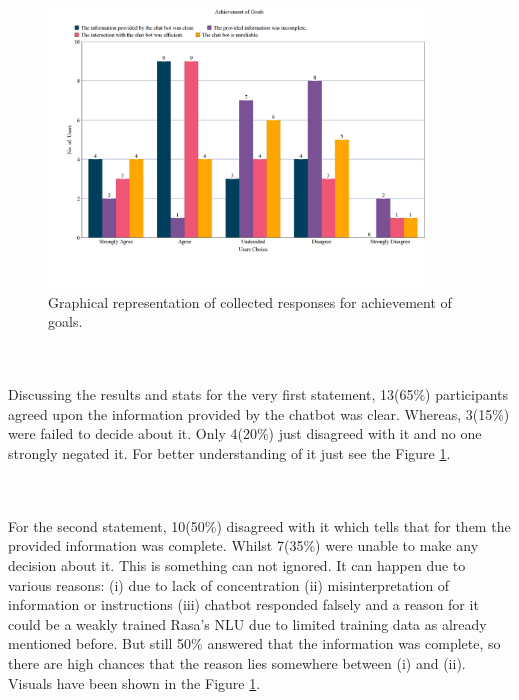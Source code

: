 \begin{figure}[!h]
    \centering
    \includegraphics[width=0.9\textwidth]{img/Achievement_of_Goals_Updated.png}
    \caption{Graphical representation of collected responses for achievement of goals.}
    \label{fig:achievGoals}
\end{figure}
\\~\\
Discussing the results and stats for the very first statement, 13(65\%) participants agreed upon the information provided by the chatbot was clear. Whereas, 3(15\%) were failed to decide about it. Only 4(20\%) just disagreed with it and no one strongly negated it. For better understanding of it just see the Figure \ref{fig:achievGoals}.

\\~\\
For the second statement, 10(50\%) disagreed with it which tells that for them the provided information was complete. Whilst 7(35\%) were unable to make any decision about it. This is something can not ignored. It can happen due to various reasons: (i) due to lack of concentration (ii) misinterpretation of information or instructions (iii) chatbot responded falsely and a reason for it could be a weakly trained Rasa's NLU due to limited training data as already mentioned before. But still 50\% answered that the information was complete, so there are high chances that the reason lies somewhere between (i) and (ii). Visuals have been shown in the Figure \ref{fig:achievGoals}.

